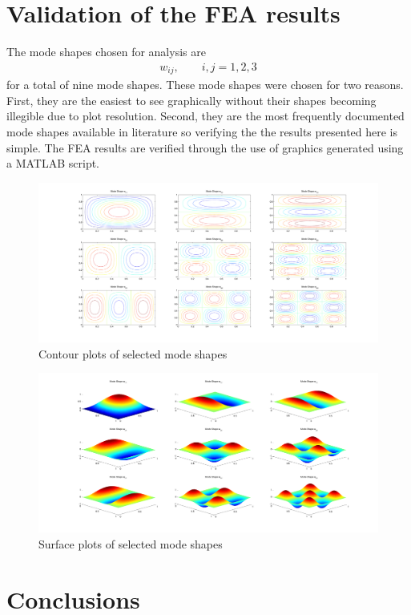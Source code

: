 \documentclass[12pt]{article}
\begin{document}
\section{Validation of the FEA results}
The mode shapes chosen for analysis are
\begin{align}
w_{ij}, \qquad i,j=1,2,3
\end{align}
for a total of nine mode shapes.  These mode shapes were chosen for two reasons.  First, they are the easiest to see graphically without their shapes becoming illegible due to plot resolution.  Second, they are the most frequently documented mode shapes available in literature so verifying the the results presented here is simple.  The FEA results are verified through the use of graphics generated using a MATLAB script.
\begin{figure}[h]
	\label{modes}
	\includegraphics[width=\textwidth]{modes}
	\caption{Contour plots of selected mode shapes}
\end{figure}

\begin{figure}[h]
	\label{modes}
	\includegraphics[width=\textwidth]{modes_surf}
	\caption{Surface plots of selected mode shapes}
\end{figure}

\section{Conclusions}
\end{document}
